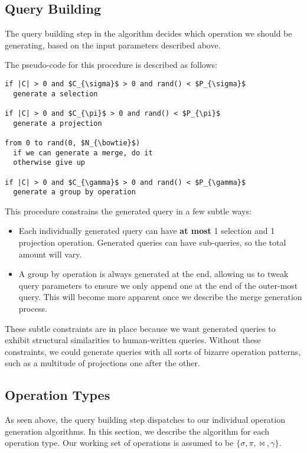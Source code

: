 \documentclass[10pt, twocolumn]{article}
\begin{document}
\subsection*{Query Building}

The query building step in the algorithm decides which operation we should be generating, based on the input parameters described above.

\spacing
\noindent
The pseudo-code for this procedure is described as follows:

\spacing
\begin{lstlisting}
if |C| > 0 and $C_{\sigma}$ > 0 and rand() < $P_{\sigma}$
  generate a selection

if |C| > 0 and $C_{\pi}$ > 0 and rand() < $P_{\pi}$
  generate a projection

from 0 to rand(0, $N_{\bowtie}$)
  if we can generate a merge, do it
  otherwise give up

if |C| > 0 and $C_{\gamma}$ > 0 and rand() < $P_{\gamma}$
  generate a group by operation
\end{lstlisting}

\spacing
\noindent
This procedure constrains the generated query in a few subtle ways:

\begin{itemize}
  \item Each individually generated query can have \textbf{at most} 1 selection and 1 projection operation. Generated queries can have sub-queries, so the total amount will vary.
  \item A group by operation is always generated at the end, allowing us to tweak query parameters to ensure we only append one at the end of the outer-most query. This will become more apparent once we describe the merge generation process.
\end{itemize}

\noindent
These subtle constraints are in place because we want generated queries to exhibit structural similarities to human-written queries. Without these constraints, we could generate queries with all sorts of bizarre operation patterns, such as a multitude of projections one after the other.

\subsection*{Operation Types}

As seen above, the query building step dispatches to our individual operation generation algorithms. In this section, we describe the algorithm for each operation type. Our working set of operations is assumed to be $\{\sigma, \pi, \bowtie, \gamma\}$.
\end{document}
